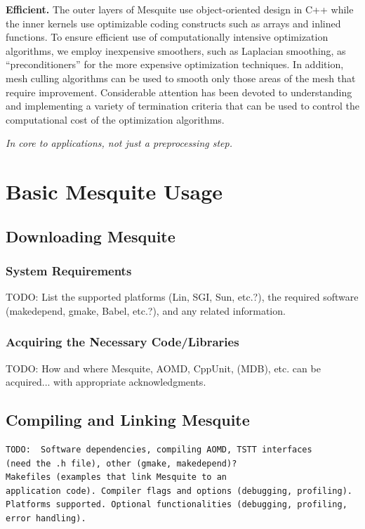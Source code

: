 \documentclass[letter]{report}
\begin{document}
{\bf Efficient.}  The outer layers of Mesquite use 
object-oriented design in C++ while the inner kernels use
optimizable coding constructs such as arrays and inlined
functions.  To ensure efficient use of computationally intensive
optimization algorithms, we employ inexpensive smoothers, such as
Laplacian smoothing, as ``preconditioners'' for the more expensive
optimization techniques.  In addition, mesh culling algorithms can be
used to smooth only those areas of the mesh that require improvement.
Considerable attention has been devoted to understanding and
implementing a variety of termination criteria that can be used to
control the computational cost of the optimization algorithms.

{\it In core to applications, not just a preprocessing step.}

\chapter{Basic Mesquite Usage}

\section{Downloading Mesquite}

\subsection{System Requirements}
TODO:  List the supported platforms (Lin, SGI, Sun, etc.?), the required
software (makedepend, gmake, Babel, etc.?), and any related information.
\subsection{Acquiring the Necessary Code/Libraries}
TODO:  How and where Mesquite, AOMD, CppUnit, (MDB), etc. can be
acquired... with appropriate acknowledgments.

\section{Compiling and Linking Mesquite}
\label{sec:compiling}
\begin{verbatim}
TODO:  Software dependencies, compiling AOMD, TSTT interfaces
(need the .h file), other (gmake, makedepend)?  
Makefiles (examples that link Mesquite to an 
application code). Compiler flags and options (debugging, profiling). 
Platforms supported. Optional functionalities (debugging, profiling, 
error handling).
\end{verbatim}
\end{document}
